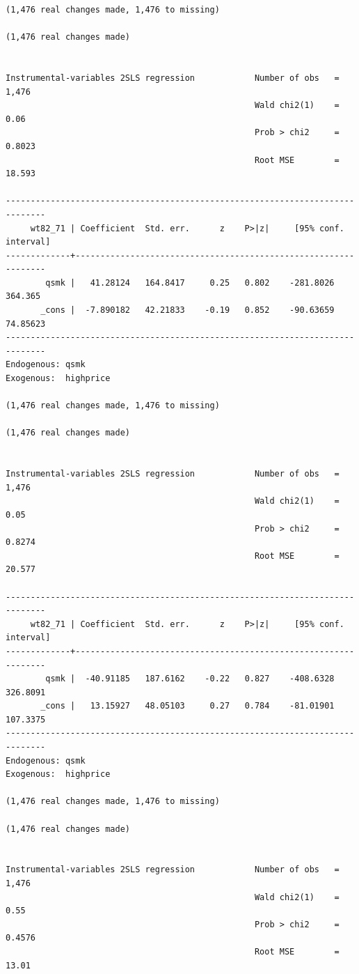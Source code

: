 \documentclass[
  10pt,
  a4paper,
]{book}
\begin{document}
\begin{verbatim}
(1,476 real changes made, 1,476 to missing)

(1,476 real changes made)


Instrumental-variables 2SLS regression            Number of obs   =      1,476
                                                  Wald chi2(1)    =       0.06
                                                  Prob > chi2     =     0.8023
                                                  Root MSE        =     18.593

------------------------------------------------------------------------------
     wt82_71 | Coefficient  Std. err.      z    P>|z|     [95% conf. interval]
-------------+----------------------------------------------------------------
        qsmk |   41.28124   164.8417     0.25   0.802    -281.8026     364.365
       _cons |  -7.890182   42.21833    -0.19   0.852    -90.63659    74.85623
------------------------------------------------------------------------------
Endogenous: qsmk
Exogenous:  highprice

(1,476 real changes made, 1,476 to missing)

(1,476 real changes made)


Instrumental-variables 2SLS regression            Number of obs   =      1,476
                                                  Wald chi2(1)    =       0.05
                                                  Prob > chi2     =     0.8274
                                                  Root MSE        =     20.577

------------------------------------------------------------------------------
     wt82_71 | Coefficient  Std. err.      z    P>|z|     [95% conf. interval]
-------------+----------------------------------------------------------------
        qsmk |  -40.91185   187.6162    -0.22   0.827    -408.6328    326.8091
       _cons |   13.15927   48.05103     0.27   0.784    -81.01901    107.3375
------------------------------------------------------------------------------
Endogenous: qsmk
Exogenous:  highprice

(1,476 real changes made, 1,476 to missing)

(1,476 real changes made)


Instrumental-variables 2SLS regression            Number of obs   =      1,476
                                                  Wald chi2(1)    =       0.55
                                                  Prob > chi2     =     0.4576
                                                  Root MSE        =      13.01


\end{verbatim}
\end{document}
